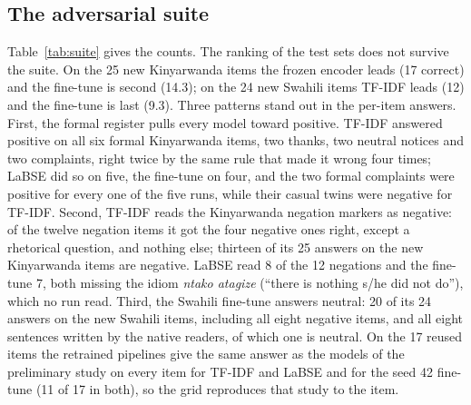 \documentclass[11pt]{article}
\begin{document}
\subsection{The adversarial suite}
Table~\ref{tab:suite} gives the counts. The ranking of the test sets does not survive the suite. On the 25 new Kinyarwanda items the frozen encoder leads (17 correct) and the fine-tune is second (14.3); on the 24 new Swahili items TF-IDF leads (12) and the fine-tune is last (9.3). Three patterns stand out in the per-item answers. First, the formal register pulls every model toward positive. TF-IDF answered positive on all six formal Kinyarwanda items, two thanks, two neutral notices and two complaints, right twice by the same rule that made it wrong four times; LaBSE did so on five, the fine-tune on four, and the two formal complaints were positive for every one of the five runs, while their casual twins were negative for TF-IDF. Second, TF-IDF reads the Kinyarwanda negation markers as negative: of the twelve negation items it got the four negative ones right, except a rhetorical question, and nothing else; thirteen of its 25 answers on the new Kinyarwanda items are negative. LaBSE read 8 of the 12 negations and the fine-tune 7, both missing the idiom \emph{ntako atagize} (``there is nothing s/he did not do''), which no run read. Third, the Swahili fine-tune answers neutral: 20 of its 24 answers on the new Swahili items, including all eight negative items, and all eight sentences written by the native readers, of which one is neutral. On the 17 reused items the retrained pipelines give the same answer as the models of the preliminary study on every item for TF-IDF and LaBSE and for the seed 42 fine-tune (11 of 17 in both), so the grid reproduces that study to the item.
\end{document}
